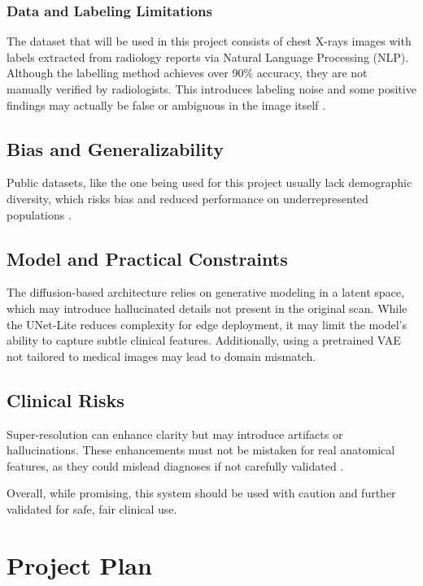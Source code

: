 \documentclass{article} %
\begin{document}
\subsubsection{Data and Labeling Limitations}

The dataset that will be used in this project consists of chest X-rays images with labels extracted from radiology reports via Natural Language Processing (NLP). Although the labelling method achieves over 90\% accuracy, they are not manually verified by radiologists. This introduces labeling noise and some positive findings may actually be false or ambiguous in the image itself \citep{olatunji2019caveats}.


\subsection{Bias and Generalizability}

Public datasets, like the one being used for this project usually lack demographic diversity, which risks bias and reduced performance on underrepresented populations \citep{Galanty2024BEAMRAD}.

\subsection{Model and Practical Constraints}

The diffusion-based architecture relies on generative modeling in a latent space, which may introduce hallucinated details not present in the original scan. While the UNet-Lite reduces complexity for edge deployment, it may limit the model’s ability to capture subtle clinical features. Additionally, using a pretrained VAE not tailored to medical images may lead to domain mismatch.

\subsection{Clinical Risks}

Super-resolution can enhance clarity but may introduce artifacts or hallucinations. These enhancements must not be mistaken for real anatomical features, as they could mislead diagnoses if not carefully validated \citep{Shin2024SuperResolution}.


Overall, while promising, this system should be used with caution and further validated for safe, fair clinical use.

\section{Project Plan}
\end{document}
